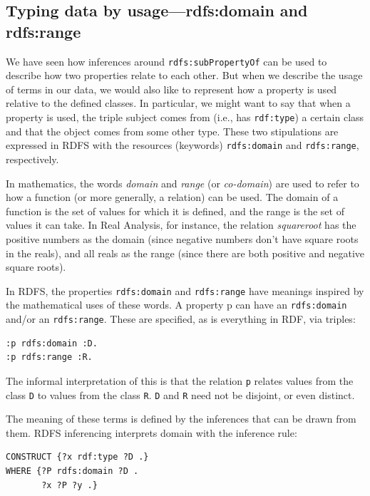 \subsection{Typing data by usage---rdfs:domain and rdfs:range}

We have seen how inferences around \texttt{rdfs:subPropertyOf} can be used to
describe how two properties relate to each other. But when we describe
the usage of terms in our data, we would also like to represent how a
property is used relative to the defined classes. In particular, we
might want to say that when a property is used, the triple subject comes
from (i.e., has \texttt{rdf:type}) a certain class and that the object comes from
some other type. These two stipulations are expressed in RDFS with the
resources (keywords) \texttt{rdfs:domain} and \texttt{rdfs:range}, respectively.

In mathematics, the words \emph{domain} and \emph{range} (or \emph{co-domain}) are used to
refer to how a function (or more generally, a relation) can be used. The
domain of a function is the set of values for which it is defined, and
the range is the set of values it can take. In Real Analysis, for
instance, the relation \emph{squareroot} has the positive numbers as the domain
(since negative numbers don't have square roots in the reals), and all
reals as the range (since there are both positive and negative square
roots).

In RDFS, the properties \texttt{rdfs:domain} and \texttt{rdfs:range} have meanings
inspired by the mathematical uses of these words. A property p can have
an \texttt{rdfs:domain} and/or an \texttt{rdfs:range}. These are specified, as is
everything in RDF, via triples:

\begin{lstlisting}
:p rdfs:domain :D.
:p rdfs:range :R.
\end{lstlisting}

The informal interpretation of this is that the relation \texttt{p} relates
values from the class \texttt{D} to values from the class \texttt{R}. \texttt{D} and \texttt{R} need not be
disjoint, or even distinct.

The meaning of these terms is defined by the inferences that can be
drawn from them. RDFS
inferencing interprets domain with the inference rule:

\begin{lstlisting}
CONSTRUCT {?x rdf:type ?D .}
WHERE {?P rdfs:domain ?D .
       ?x ?P ?y .}
\end{lstlisting}

